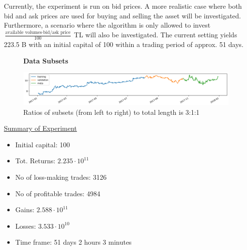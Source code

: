 \documentclass{article}
\begin{document}
Currently, the experiment is run on bid prices. A more realistic case where both bid and ask prices are used for buying and selling the asset will be investigated. Furthermore, a scenario where the algorithm is only allowed to invest $\frac{\text{available volumes} \cdot \text{bid/ask price}}{100}$ TL will also be investigated. The current setting yields 223.5 B with an initial capital of 100 within a trading period of approx. 51 days.
\clearpage

\begin{figure}[!htbp]
     \centering
     \textbf{Data Subsets}\par\medskip
     \includegraphics[scale=0.48]{data_split.png}
     \caption{Ratios of subsets (from left to right) to total length is 3:1:1}
     \label{fig::data_split}
\end{figure}

\begin{center}
    \underline{Summary of Experiment}
    \begin{itemize}
        \item Initial capital: 100
        \item Tot. Returns: $2.235 \cdot 10^{11}$
        \item No of loss-making trades: 3126
        \item No of profitable trades: 4984
        \item Gains: $2.588 \cdot 10^{11}$
        \item Losses: $3.533 \cdot 10^{10}$
        \item Time frame: 51 days 2 hours 3 minutes
    \end{itemize}
\end{center}
\end{document}
